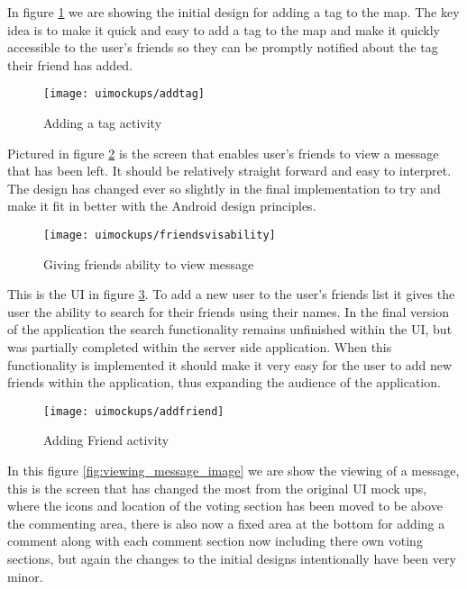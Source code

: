 \noindent
In figure \ref{fig:add_tag_activity_image} we are showing the initial design for adding a tag to the map. The key idea is to make it quick and easy to add a tag to the map and make it quickly accessible to the user's friends so they can be promptly notified about the tag their friend has added.\\

\begin{figure}[htb!]
    \centering
    \texttt{[image: uimockups/addtag]}
    \caption{Adding a tag activity}
    \label{fig:add_tag_activity_image}
\end{figure}

\noindent
Pictured in figure \ref{fig:giving_friends_visability_image} is the screen that enables user's friends to view a message that has been left. It should be relatively straight forward and easy to interpret. The design has changed ever so slightly in the final implementation to try and make it fit in better with the Android design principles.\\

\begin{figure}[htb!]
    \centering
    \texttt{[image: uimockups/friendsvisability]}
    \caption{Giving friends ability to view message}
    \label{fig:giving_friends_visability_image}
\end{figure} 

\noindent
This is the UI in figure \ref{fig:add_friend_activity_image}. To add a new user to the user's friends list it gives the user the ability to search for their friends using their names. In the final version of the application the search functionality remains unfinished within the UI, but was partially completed within the server side application. When this functionality is implemented it should make it very easy for the user to add new friends within the application, thus expanding the audience of the application.\\


\begin{figure}[htb!]
    \centering
    \texttt{[image: uimockups/addfriend]}
    \caption{Adding Friend activity}
    \label{fig:add_friend_activity_image}
\end{figure} 

\noindent
In this figure \ref{fig:viewing_message_image} we are show the viewing of a message, this is the screen that has changed the most from the original UI mock ups, where the icons and location of the voting section has been moved to be above the commenting area, there is also now a fixed area at the bottom for adding a comment along with each comment section now including there own voting sections, but again the changes to the initial designs intentionally have been very minor.\\

